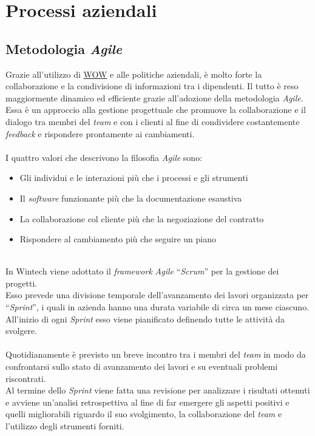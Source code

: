 \section{Processi aziendali}
\subsection{Metodologia \emph{Agile}}
Grazie all'utilizzo di \hyperref[WOW]{WOW} e alle politiche aziendali, è molto forte la collaborazione e la condivisione di informazioni tra i dipendenti. Il tutto è reso maggiormente dinamico ed efficiente grazie all'adozione della metodologia \emph{Agile}.\\
Essa è un approccio alla gestione progettuale che promuove la collaborazione e il dialogo tra membri del \emph{team} e con i clienti al fine di condividere costantemente \emph{feedback} e rispondere prontamente ai cambiamenti.\\\\
I quattro valori che descrivono la filosofia \emph{Agile} sono:
\begin{itemize}
    \item Gli individui e le interazioni più che i processi e gli strumenti 
    \item Il \emph{software} funzionante più che la documentazione esaustiva  
    \item La collaborazione col cliente più che la negoziazione del contratto 
    \item Rispondere al cambiamento più che seguire un piano\\\\
\end{itemize}
In Wintech viene adottato il \emph{framework} \emph{Agile} “\emph{Scrum}” per la gestione dei progetti.\\
Esso prevede una divisione temporale dell'avanzamento dei lavori organizzata per “\emph{Sprint}”, i quali in azienda hanno una durata variabile di circa un mese ciascuno.\\
All'inizio di ogni \emph{Sprint} esso viene pianificato definendo tutte le attività da svolgere.\\\\
Quotidianamente è previsto un breve incontro tra i membri del \emph{team} in modo da confrontarsi sullo stato di avanzamento dei lavori e su eventuali problemi riscontrati.\\
Al termine dello \emph{Sprint} viene fatta una revisione per analizzare i risultati ottenuti e avviene un'analisi retrospettiva al fine di far emergere gli aspetti positivi e quelli migliorabili riguardo il suo svolgimento, la collaborazione del \emph{team} e l'utilizzo degli strumenti forniti.\\\\


